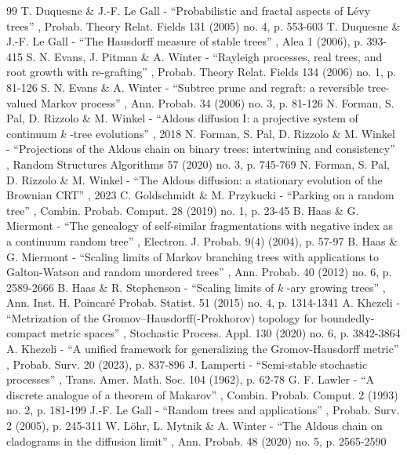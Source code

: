 \begin{thebibliography}{99}
 T. Duquesne \& J.-F. Le Gall - “Probabilistic and fractal aspects of Lévy trees” , Probab. Theory Relat. Fields 131 (2005) no. 4, p. 553-603
 T. Duquesne \& J.-F. Le Gall - “The Hausdorff measure of stable trees” , Alea 1 (2006), p. 393-415
 S. N. Evans, J. Pitman \& A. Winter - “Rayleigh processes, real trees, and root growth with re-grafting” , Probab. Theory Relat. Fields 134 (2006) no. 1, p. 81-126
 S. N. Evans \& A. Winter - “Subtree prune and regraft: a reversible tree-valued Markov process” , Ann. Probab. 34 (2006) no. 3, p. 81-126
 N. Forman, S. Pal, D. Rizzolo \& M. Winkel - “Aldous diffusion I: a projective system of continuum $k$ -tree evolutions” , 2018
 N. Forman, S. Pal, D. Rizzolo \& M. Winkel - “Projections of the Aldous chain on binary trees: intertwining and consistency” , Random Structures Algorithms 57 (2020) no. 3, p. 745-769
 N. Forman, S. Pal, D. Rizzolo \& M. Winkel - “The Aldous diffusion: a stationary evolution of the Brownian CRT” , 2023
 C. Goldschmidt \& M. Przykucki - “Parking on a random tree” , Combin. Probab. Comput. 28 (2019) no. 1, p. 23-45
 B. Haas \& G. Miermont - “The genealogy of self-similar fragmentations with negative index as a continuum random tree” , Electron. J. Probab. 9(4) (2004), p. 57-97
 B. Haas \& G. Miermont - “Scaling limits of Markov branching trees with applications to Galton-Watson and random unordered trees” , Ann. Probab. 40 (2012) no. 6, p. 2589-2666
 B. Haas \& R. Stephenson - “Scaling limits of $k$ -ary growing trees” , Ann. Inst. H. Poincaré Probab. Statist. 51 (2015) no. 4, p. 1314-1341
 A. Khezeli - “Metrization of the Gromov–Hausdorff(-Prokhorov) topology for boundedly-compact metric spaces” , Stochastic Process. Appl. 130 (2020) no. 6, p. 3842-3864
 A. Khezeli - “A unified framework for generalizing the Gromov-Hausdorff metric” , Probab. Surv. 20 (2023), p. 837-896
 J. Lamperti - “Semi-stable stochastic processes” , Trans. Amer. Math. Soc. 104 (1962), p. 62-78
 G. F. Lawler - “A discrete analogue of a theorem of Makarov” , Combin. Probab. Comput. 2 (1993) no. 2, p. 181-199
 J.-F. Le Gall - “Random trees and applications” , Probab. Surv. 2 (2005), p. 245-311
 W. Löhr, L. Mytnik \& A. Winter - “The Aldous chain on cladograms in the diffusion limit” , Ann. Probab. 48 (2020) no. 5, p. 2565-2590

\end{thebibliography}
